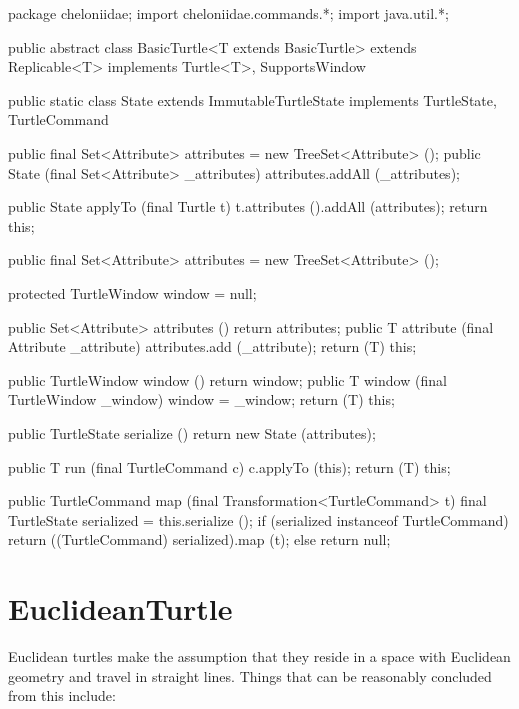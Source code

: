 \documentclass{report}
\begin{document}
\begin{javacode}
package cheloniidae;
import cheloniidae.commands.*;
import java.util.*;

public abstract class BasicTurtle<T extends BasicTurtle>
              extends Replicable<T>
           implements Turtle<T>, SupportsWindow {

  public static class State
              extends ImmutableTurtleState
           implements TurtleState, TurtleCommand {

    public final Set<Attribute> attributes = new TreeSet<Attribute> ();
    public State (final Set<Attribute> _attributes) {attributes.addAll (_attributes);}

    public State applyTo (final Turtle t) {
      t.attributes ().addAll (attributes);
      return this;
    }
  }

  public final Set<Attribute> attributes = new TreeSet<Attribute> ();

  protected TurtleWindow window = null;

  public Set<Attribute> attributes ()                           {return attributes;}
  public T              attribute  (final Attribute _attribute) {attributes.add (_attribute);
                                                                 return (T) this;}

  public TurtleWindow   window     ()                           {return window;}
  public T              window     (final TurtleWindow _window) {window = _window; return (T) this;}

  public TurtleState serialize () {return new State (attributes);}

  public T run (final TurtleCommand c) {
    c.applyTo (this);
    return (T) this;
  }

  public TurtleCommand map (final Transformation<TurtleCommand> t) {
    final TurtleState serialized = this.serialize ();
    if (serialized instanceof TurtleCommand) return ((TurtleCommand) serialized).map (t);
    else                                     return null;
  }
}
\end{javacode}
      
\section {EuclideanTurtle} \label{sec:euclideanturtle}
      Euclidean turtles make the assumption that they reside in a space with Euclidean geometry and travel in straight lines. Things that can be reasonably
      concluded from this include:
\end{document}
